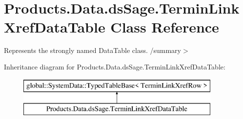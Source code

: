 \hypertarget{class_products_1_1_data_1_1ds_sage_1_1_termin_link_xref_data_table}{}\section{Products.\+Data.\+ds\+Sage.\+Termin\+Link\+Xref\+Data\+Table Class Reference}
\label{class_products_1_1_data_1_1ds_sage_1_1_termin_link_xref_data_table}


Represents the strongly named Data\+Table class. /summary$>$  


Inheritance diagram for Products.\+Data.\+ds\+Sage.\+Termin\+Link\+Xref\+Data\+Table\+:\begin{figure}[H]
\begin{center}
\leavevmode
\includegraphics[height=2.000000cm]{class_products_1_1_data_1_1ds_sage_1_1_termin_link_xref_data_table}
\end{center}
\end{figure}
